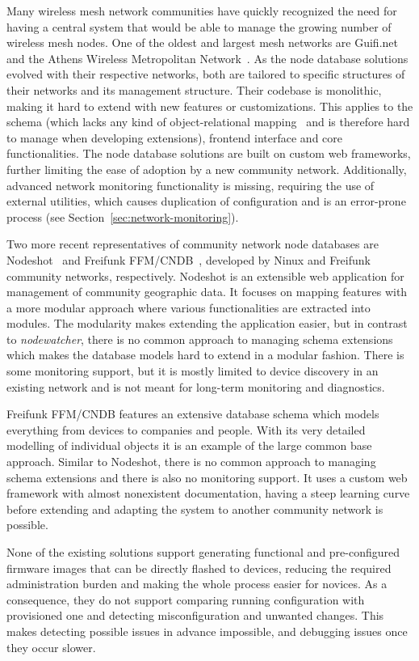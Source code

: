 \documentclass[5p,sort&compress]{elsarticle}
\newcommand{\nodewatcher}{\textit{nodewatcher}}
\begin{document}
Many wireless mesh network communities have quickly recognized the need for having a central system that would be able to manage the growing number of wireless mesh nodes.
One of the oldest and largest mesh networks are Guifi.net~\cite{Guifinode_2003,Vega_2012} and the Athens Wireless Metropolitan Network~\cite{AWMN_WIND_2002}.
As the node database solutions evolved with their respective networks, both are tailored to specific structures of their networks and its management structure.
Their codebase is monolithic, making it hard to extend with new features or customizations.
This applies to the schema (which lacks any kind of object-relational mapping~\cite{ONeil_2008} and is therefore hard to manage when developing extensions), frontend interface and core functionalities.
The node database solutions are built on custom web frameworks, further limiting the ease of adoption by a new community network.
Additionally, advanced network monitoring functionality is missing, requiring the use of external utilities, which causes duplication of configuration and is an error-prone process (see Section~\ref{sec:network-monitoring}).

Two more recent representatives of community network node databases are Nodeshot~\cite{Nodeshot_2012} and Freifunk FFM/CNDB~\cite{Funkfeuer_2012}, developed by Ninux and Freifunk community networks, respectively.
Nodeshot is an extensible web application for management of community geographic data.
It focuses on mapping features with a more modular approach where various functionalities are extracted into modules.
The modularity makes extending the application easier, but in contrast to \nodewatcher{}, there is no common approach to managing schema extensions which makes the database models hard to extend in a modular fashion.
There is some monitoring support, but it is mostly limited to device discovery in an existing network and is not meant for long-term monitoring and diagnostics.

Freifunk FFM/CNDB features an extensive database schema which models everything from devices to companies and people.
With its very detailed modelling of individual objects it is an example of the large common base approach.
Similar to Nodeshot, there is no common approach to managing schema extensions and there is also no monitoring support.
It uses a custom web framework with almost nonexistent documentation, having a steep learning curve before extending and adapting the system to another community network is possible.

None of the existing solutions support generating functional and pre-configured firmware images that can be directly flashed to devices, reducing the required administration burden and making the whole process easier for novices.
As a consequence, they do not support comparing running configuration with provisioned one and detecting misconfiguration and unwanted changes.
This makes detecting possible issues in advance impossible, and debugging issues once they occur slower.
\end{document}
